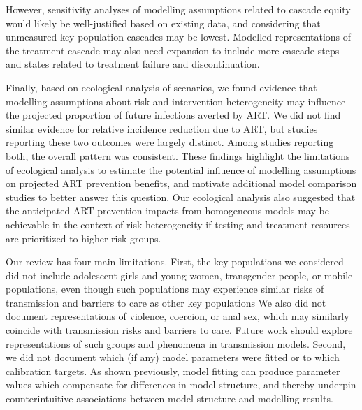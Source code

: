 However, sensitivity analyses of modelling assumptions related to cascade equity
would likely be well-justified based on existing data,\cite{Mountain2014,Green2020}
and considering that unmeasured key population cascades may be lowest.\cite{Roberts2020}
Modelled representations of the treatment cascade may also need expansion
to include more cascade steps and states related to treatment failure and discontinuation.
\par
Finally, based on ecological analysis of scenarios, we found evidence that
modelling assumptions about risk and intervention heterogeneity
may influence the projected proportion of future infections averted by ART.
We did not find similar evidence for relative incidence reduction due to ART,
but studies reporting these two outcomes were largely distinct.
Among studies reporting both, the overall pattern was consistent.
These findings highlight the limitations of ecological analysis to estimate
the potential influence of modelling assumptions on projected ART prevention benefits,
and motivate additional model comparison studies to better answer this question.
Our ecological analysis also suggested that the anticipated ART prevention impacts from homogeneous models
may be achievable in the context of risk heterogeneity
if testing and treatment resources are prioritized to higher risk groups.
\par
Our review has four main limitations.
First, the key populations we considered did not include
adolescent girls and young women, transgender people, or mobile populations,
even though such populations may experience similar risks of transmission and barriers to care
as other key populations\cite{Tanser2015,Dellar2015}
We also did not document representations of violence, coercion, or anal sex,
which may similarly coincide with transmission risks and barriers to care.
\cite{Silverman2011,Baggaley2013}
Future work should explore representations of
such groups and phenomena in transmission models.
Second, we did not document which (if any) model parameters were fitted
or to which calibration targets.
As shown previously\cite{Eaton2014a,Knight2020}, model fitting can produce
parameter values which compensate for differences in model structure,
and thereby underpin counterintuitive associations between model structure and modelling results.
